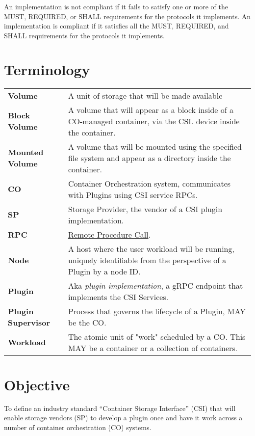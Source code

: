 \documentclass[12pt]{article}
\begin{document}
An implementation is not compliant if it fails to satisfy one or more of
the MUST, REQUIRED, or SHALL requirements for the protocols it
implements. An implementation is compliant if it satisfies all the MUST,
REQUIRED, and SHALL requirements for the protocols it implements.

\newpage
\section{Terminology}

  \begin{tabular}{lp{24em}}
    \bfseries Volume	& A unit of storage that will be made available \\
    \bfseries Block  Volume &	A volume that will appear as a block
    inside of a CO-managed container, via the CSI. device inside the container. \\
    \bfseries Mounted Volume	& A volume that will be mounted using the
    specified file system and appear as a directory inside the
    container. \\
    \bfseries CO	& Container Orchestration system, communicates with
    Plugins using CSI service RPCs. \\
    \bfseries SP	& Storage Provider, the vendor of a CSI plugin
    implementation. \\
    \bfseries RPC	& \href{https://en.wikipedia.org/wiki/Remote\_procedure\_call}{Remote Procedure Call}. \\
    \bfseries Node	& A host where the user workload will be running,
    uniquely identifiable from the perspective of a Plugin by a node ID.
    \\
    \bfseries Plugin	& Aka \emph{plugin implementation}, a gRPC endpoint
    that implements the CSI Services. \\
    \bfseries Plugin  Supervisor&	Process that governs the lifecycle
    of a Plugin, MAY be the CO. \\
    \bfseries Workload	& The atomic unit of "work" scheduled by a CO.
    This MAY be a container or a collection of containers. \\

\end{tabular}

\newpage
\section{Objective}

To define an industry standard “Container Storage Interface” (CSI) that
will enable storage vendors (SP) to develop a plugin once and have it
work across a number of container orchestration (CO) systems.
\end{document}
